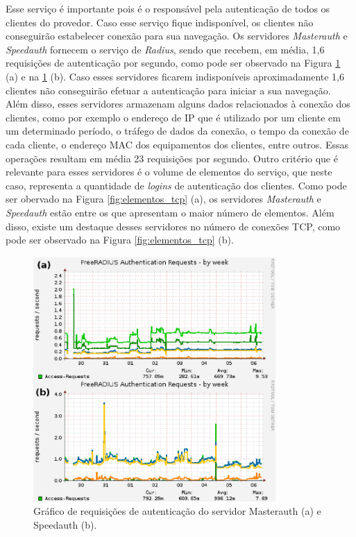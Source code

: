 Esse serviço é importante pois é o responsável pela autenticação de todos os clientes do provedor. Caso esse serviço fique indisponível, 
os clientes não conseguirão estabelecer conexão para sua navegação. Os servidores \textit{Masterauth} e \textit{Speedauth} fornecem o serviço de
\textit{Radius}, sendo que recebem, em média, 1,6 requisições de autenticação por segundo, como pode ser observado na Figura 
\ref{fig:freeradius_auth} (a) e na \ref{fig:freeradius_auth} (b). Caso esses servidores ficarem indisponíveis aproximadamente 1,6 clientes 
não conseguirão efetuar a autenticação para iniciar a sua navegação. Além disso, esses servidores armazenam alguns dados relacionados à conexão 
dos clientes, como por exemplo o endereço de \ac{IP} que é utilizado por um cliente em um determinado período, o tráfego de dados da conexão, 
o tempo da conexão de cada cliente, o endereço \ac{MAC} dos equipamentos dos clientes, entre outros. Essas operações resultam em média 23 
requisições por segundo. %
Outro critério que é relevante para esses servidores é o volume de elementos do serviço, que neste caso, representa a quantidade de \textit{logins} 
de autenticação dos clientes. Como pode ser obervado na Figura \ref{fig:elementos_tcp} (a), os servidores \textit{Masterauth} e \textit{Speedauth}
estão entre os que apresentam o maior número de elementos. Além disso, existe um destaque desses servidores no número de conexões \ac{TCP}, como 
pode ser observado na Figura \ref{fig:elementos_tcp} (b).

\begin{figure}[h!]
 \centering
 \includegraphics[width=350px]{img/freeradius_auth.eps}
 \caption{Gráfico de requisições de autenticação do servidor Masterauth (a) e Speedauth (b).}
 \label{fig:freeradius_auth}
\end{figure}

